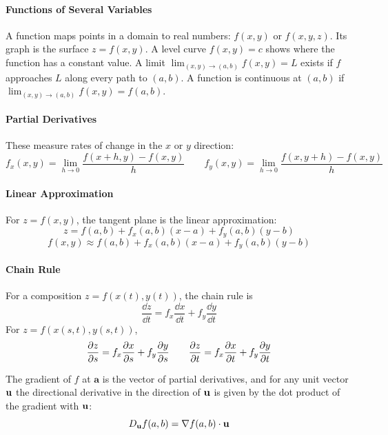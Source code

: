 \documentclass[oneside]{book}
\begin{document}
\paragraph{Functions of Several Variables}
A function maps points in a domain to real numbers: $f(x,y)$ or $f(x,y,z)$. Its graph is the surface $z=f(x,y)$. A level curve $f(x,y)=c$ shows where the function has a constant value. A limit $\lim_{(x,y)\to(a,b)} f(x,y)=L$ exists if $f$ approaches $L$ along every path to $(a,b)$. A function is continuous at $(a,b)$ if $\lim_{(x,y)\to(a,b)}f(x,y)=f(a,b)$.

\paragraph{Partial Derivatives} These measure rates of change in the $x$ or $y$ direction:
\[
    f_x(x,y)=\lim_{h\to 0}\frac{f(x+h,y)-f(x,y)}{h}
\qquad
    f_y(x,y)=\lim_{h\to 0}\frac{f(x,y+h)-f(x,y)}{h}
\]



\paragraph{Linear Approximation} For $z=f(x,y)$, the tangent plane is the linear approximation:
\[
    z=f(a,b)+f_x(a,b)(x-a)+f_y(a,b)(y-b)
\]
\[
    f(x,y)\approx f(a,b)+f_x(a,b)(x-a)+f_y(a,b)(y-b)
\]

\paragraph{Chain Rule}

For a composition $z=f(x(t),y(t))$, the chain rule is
\[
    \frac{\dd z}{\dd t}=f_x\frac{\dd x}{\dd t}+f_y\frac{\dd y}{\dd t}
\]
For $z=f(x(s,t),y(s,t))$,
\[
    \frac{\partial z}{\partial s}=f_x\frac{\partial x}{\partial s}+f_y\frac{\partial y}{\partial s}
    \qquad
    \frac{\partial z}{\partial t}=f_x\frac{\partial x}{\partial t}+f_y\frac{\partial y}{\partial t}
\]


\noindent The gradient of $f$ at $\mathbf{a}$ is the vector of partial derivatives, and for any unit vector $\mathbf{u}$ the directional derivative in the direction of $\mathbf{u}$ is given by the dot product of the gradient with $\mathbf{u}$:
\[
    D_{\mathbf{u}}f(a,b)=\nabla f(a,b)\cdot \mathbf{u}
\]
\end{document}

